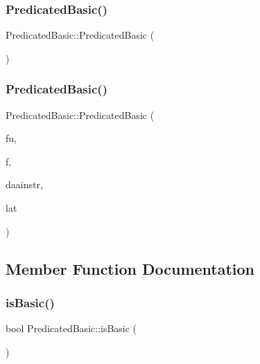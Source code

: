 \subsubsection{\texorpdfstring{Predicated\+Basic()}{PredicatedBasic()}\hspace{0.1cm}{\footnotesize\ttfamily [1/2]}}
{\footnotesize\ttfamily Predicated\+Basic\+::\+Predicated\+Basic (\begin{DoxyParamCaption}{ }\end{DoxyParamCaption})}

\mbox{\label{classPredicatedBasic_a4c246f86d2d5b6239fa61e9ef8abeec8}} 
\subsubsection{\texorpdfstring{Predicated\+Basic()}{PredicatedBasic()}\hspace{0.1cm}{\footnotesize\ttfamily [2/2]}}
{\footnotesize\ttfamily Predicated\+Basic\+::\+Predicated\+Basic (\begin{DoxyParamCaption}\item[{const string \&}]{fu,  }\item[{const set$<$ \hyperlink{classInstructionFormat}{Instruction\+Format} $\ast$$>$ \&}]{f,  }\item[{\hyperlink{classDAAInstruction}{D\+A\+A\+Instruction} $\ast$}]{daainstr,  }\item[{int}]{lat }\end{DoxyParamCaption})}



\subsection{Member Function Documentation}
\mbox{\label{classPredicatedBasic_ad3f2e7d2feaef666dd784fcae0f03125}} 
\subsubsection{\texorpdfstring{is\+Basic()}{isBasic()}}
{\footnotesize\ttfamily bool Predicated\+Basic\+::is\+Basic (\begin{DoxyParamCaption}{ }\end{DoxyParamCaption})\hspace{0.3cm}{\ttfamily [virtual]}}

